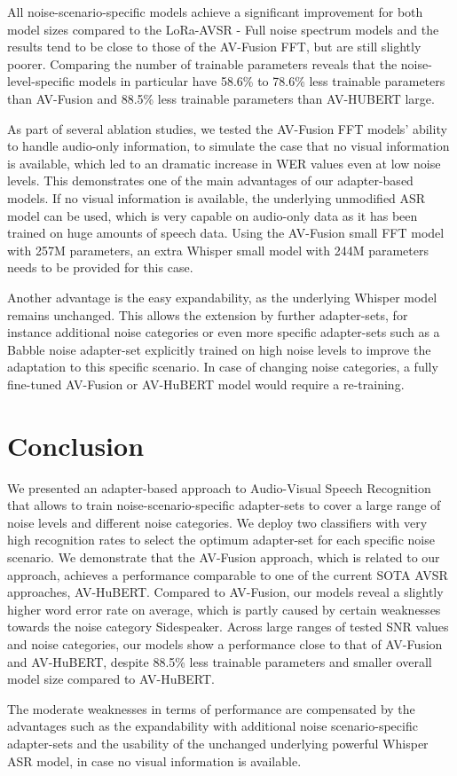 All noise-scenario-specific models achieve a significant improvement for both model sizes compared to the LoRa-AVSR - Full noise spectrum models and the results tend to be close to those of the AV-Fusion FFT, but are still slightly poorer. Comparing the number of trainable parameters reveals that the noise-level-specific models in particular have 58.6\% to 78.6\% less trainable parameters than AV-Fusion and 88.5\% less trainable parameters than AV-HUBERT large.

As part of several ablation studies, we tested the AV-Fusion FFT models' ability to handle audio-only information, to simulate the case that no visual information is available, which led to an dramatic increase in WER values even at low noise levels. This demonstrates one of the main advantages of our adapter-based models. If no visual information is available, the underlying unmodified ASR model can be used, which is very capable on audio-only data as it has been trained on huge amounts of speech data. Using the AV-Fusion small FFT model with 257M parameters, an extra Whisper small model with 244M parameters needs to be provided for this case.

Another advantage is the easy expandability, as the underlying Whisper model remains unchanged. This allows the extension by further adapter-sets, for instance additional noise categories or even more specific adapter-sets such as a Babble noise adapter-set explicitly trained on high noise levels to improve the adaptation to this specific scenario. In case of changing noise categories, a fully fine-tuned AV-Fusion or AV-HuBERT model would require a re-training.


\section{Conclusion}

We presented an adapter-based approach to Audio-Visual Speech Recognition that allows to train noise-scenario-specific adapter-sets to cover a large range of noise levels and different noise categories. 
We deploy two classifiers with very high recognition rates to select the optimum adapter-set for each specific noise scenario.
We demonstrate that the AV-Fusion approach, which is related to our approach, achieves a performance comparable to one of the current SOTA AVSR approaches, AV-HuBERT.
Compared to AV-Fusion, our models reveal a slightly higher word error rate on average, which is partly caused by certain weaknesses towards the noise category Sidespeaker. Across large ranges of tested SNR values and noise categories, our models show a performance close to that of AV-Fusion and AV-HuBERT, despite 88.5\% less trainable parameters and smaller overall model size compared to AV-HuBERT. 

The moderate weaknesses in terms of performance are compensated by the advantages such as the expandability with additional noise scenario-specific adapter-sets and the usability of the unchanged underlying powerful Whisper ASR model, in case no visual information is available.
